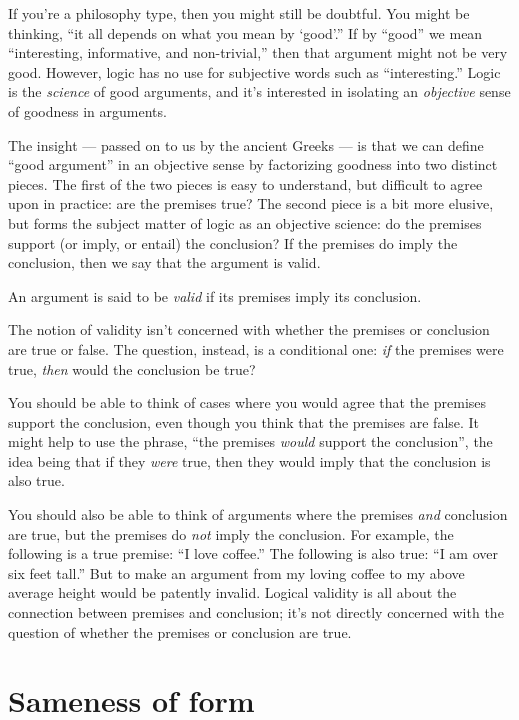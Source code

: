 If you're a philosophy type, then you might still be doubtful.  You
might be thinking, ``it all depends on what you mean by `good'.''  If
by ``good'' we mean ``interesting, informative, and non-trivial,''
then that argument might not be very good.  However, logic has no use
for subjective words such as ``interesting.''  Logic is the
\textit{science} of good arguments, and it's interested in isolating
an \textit{objective} sense of goodness in arguments.

The insight --- passed on to us by the ancient Greeks --- is that we
can define ``good argument'' in an objective sense by factorizing
goodness into two distinct pieces.  The first of the two pieces is
easy to understand, but difficult to agree upon in practice: are the
premises true?  The second piece is a bit more elusive, but forms the
subject matter of logic as an objective science: do the premises
support (or imply, or entail) the conclusion?  If the premises do
imply the conclusion, then we say that the argument is valid.
\begin{defn}
  An argument is said to be \emph{\gls{valid}} if its premises imply
  its conclusion. \end{defn} The notion of validity isn't concerned
with whether the premises or conclusion are true or false.  The
question, instead, is a conditional one: \textit{if} the premises were
true, \textit{then} would the conclusion be true?

You should be able to think of cases where you would agree that the
premises support the conclusion, even though you think that the
premises are false.  It might help to use the phrase, ``the premises
\textit{would} support the conclusion'', the idea being that if they
\textit{were} true, then they would imply that the conclusion is also
true.

You should also be able to think of arguments where the premises
\textit{and} conclusion are true, but the premises do \textit{not}
imply the conclusion.  For example, the following is a true premise:
``I love coffee.''  The following is also true: ``I am over six feet
tall.''  But to make an argument from my loving coffee to my above
average height would be patently invalid.  Logical validity is all
about the connection between premises and conclusion; it's not
directly concerned with the question of whether the premises or
conclusion are true.

\section{Sameness of form}

